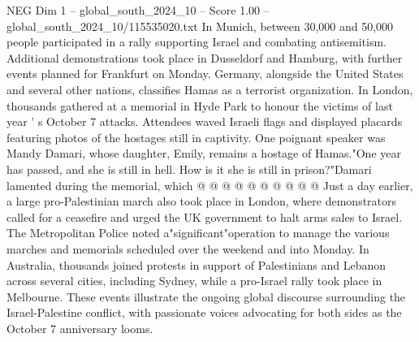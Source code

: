 \begin{textsample}{NEG Dim 1 – global\_south\_2024\_10 – Score 1.00 – global\_south\_2024\_10/115535020.txt}
In Munich, between 30,000 and 50,000 people participated in a rally supporting Israel and combating antisemitism.
Additional demonstrations took place in Dusseldorf and Hamburg, with further events planned for Frankfurt on Monday.
Germany, alongside the United States and several other nations, classifies Hamas as a terrorist organization.
In London, thousands gathered at a memorial in Hyde Park to honour the victims of last year ' s October 7 attacks.
Attendees waved Israeli flags and displayed placards featuring photos of the hostages still in captivity.
One poignant speaker was Mandy Damari, whose daughter, Emily, remains a hostage of Hamas."One year has passed, and she is still in hell.
How is it she is still in prison?"Damari lamented during the memorial, which @ @ @ @ @ @ @ @ @ @ Just a day earlier, a large pro-Palestinian march also took place in London, where demonstrators called for a ceasefire and urged the UK government to halt arms sales to Israel.
The Metropolitan Police noted a"significant"operation to manage the various marches and memorials scheduled over the weekend and into Monday.
In Australia, thousands joined protests in support of Palestinians and Lebanon across several cities, including Sydney, while a pro-Israel rally took place in Melbourne.
These events illustrate the ongoing global discourse surrounding the Israel-Palestine conflict, with passionate voices advocating for both sides as the October 7 anniversary looms.

\end{textsample}
